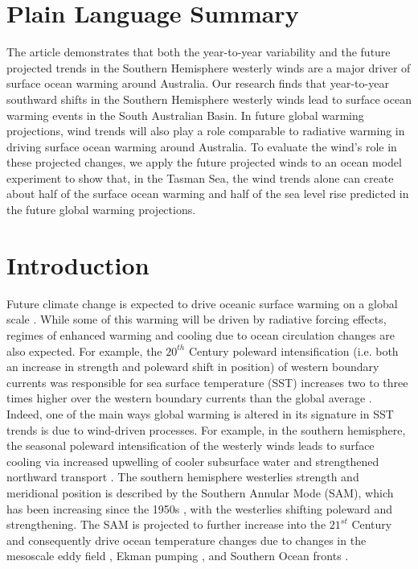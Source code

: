 \documentclass[draft,linenumbers]{agujournal2018}
\begin{document}
\section*{Plain Language Summary}
The article demonstrates that both the year-to-year variability and the future projected trends in the Southern Hemisphere westerly winds are a major driver of surface ocean warming around Australia. Our research finds that year-to-year southward shifts in the Southern Hemisphere westerly winds lead to surface ocean warming events in the South Australian Basin. In future global warming projections, wind trends will also play a role comparable to radiative warming in driving surface ocean warming around Australia. To evaluate the wind's role in these projected changes, we apply the future projected winds to an ocean model experiment to show that, in the Tasman Sea, the wind trends alone can create about half of the surface ocean warming and half of the sea level rise predicted in the future global warming projections.


\section{Introduction}
Future climate change is expected to drive oceanic surface warming on a global scale \citep{Stocker2013}. While some of this warming will be driven by radiative forcing effects, regimes of enhanced warming and cooling due to ocean circulation changes are also expected. For example, the $20^{th}$ Century poleward intensification (i.e. both an increase in strength and poleward shift in position) of western boundary currents was responsible for sea surface temperature (SST) increases two to three times higher over the western boundary currents than the global average \citep{Wu2012}. Indeed, one of the main ways global warming is altered in its signature in SST trends is due to wind-driven processes. For example, in the southern hemisphere, the seasonal poleward intensification of the westerly winds leads to surface cooling via increased upwelling of cooler subsurface water and strengthened northward transport \citep{Purich2016}. The southern hemisphere westerlies strength and meridional position is described by the Southern Annular Mode (SAM), which has been increasing since the 1950s \citep{Marshall2003}, with the westerlies shifting poleward and strengthening. The SAM is projected to further increase into the $21^{st}$ Century \citep{Gillett2013} and consequently drive ocean temperature changes due to changes in the mesoscale eddy field \citep{Screen2009}, Ekman pumping \citep{Purich2016}, and Southern Ocean fronts \citep{Spence2010}.
\end{document}
